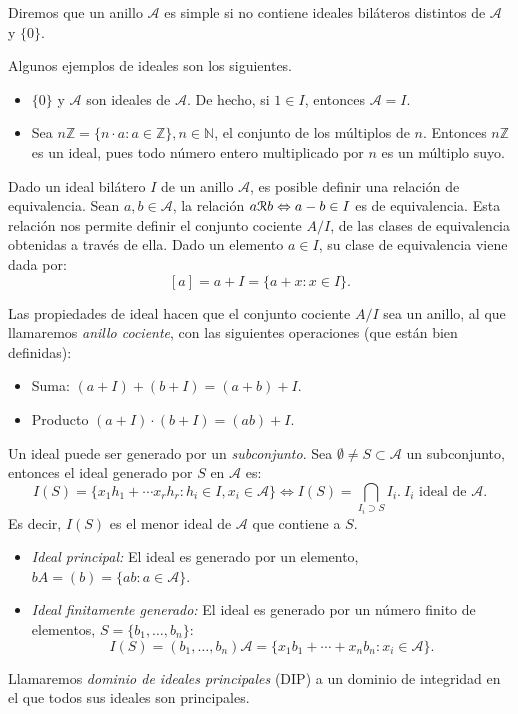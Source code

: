 \begin{definicion}
Diremos que un anillo $\mathcal{A}$ es simple si no contiene ideales biláteros distintos de $\mathcal{A}$ y $\{0\}$.
\end{definicion}

\begin{ejemplo} Algunos ejemplos de ideales son los siguientes.
    \begin{itemize}
        \item $\{0\}$ y $\mathcal{A}$ son ideales de $\mathcal{A}$. De hecho, si $1 \in I$, entonces $\mathcal{A} = I$.
        \item Sea $n\mathds{Z} = \{n\cdot a : a \in \mathds{Z}\}, n \in \mathds{N}$, el conjunto de los múltiplos de $n$. Entonces $n\mathds{Z}$ es un ideal, pues todo número entero multiplicado por $n$ es un múltiplo suyo.
    \end{itemize}
\end{ejemplo}

Dado un ideal bilátero $I$ de un anillo $\mathcal{A}$, es posible definir una relación de equivalencia. Sean $a,b \in \mathcal{A}$, la relación $a\mathcal R b \Leftrightarrow a - b \in I$ es de equivalencia. Esta relación nos permite definir el conjunto cociente $A/I$, de las clases de equivalencia obtenidas a través de ella. Dado un elemento $a \in I$, su clase de equivalencia viene dada por: $$ [a] = a + I = \{a + x : x \in I\}.$$

Las propiedades de ideal hacen que el conjunto cociente $A/I$ sea un anillo, al que llamaremos \emph{anillo cociente}, con las siguientes operaciones (que están bien definidas):
\begin{itemize}
    \item Suma: $(a + I) + (b + I) = (a + b) + I$.
    \item Producto $(a + I)\cdot(b + I) = (ab) + I$.
\end{itemize}

Un ideal puede ser generado por un \emph{subconjunto}. Sea $\emptyset \neq S \subset \mathcal{A}$ un subconjunto, entonces el ideal generado por $S$ en $\mathcal{A}$ es: 
$$I(S) = \{x_1h_1 + \cdots x_rh_r: h_i \in I, x_i \in \mathcal{A}\} \Leftrightarrow I(S) = \bigcap_{I_i \supset S} I_i. \ I_i \text{ ideal de }\mathcal{A}.$$
Es decir, $I(S)$ es el menor ideal de $\mathcal{A}$ que contiene a $S$.

    \begin{itemize}
    \item \emph{Ideal principal:} El ideal es generado por un elemento, $bA = (b) = \{ab : a \in \mathcal{A}\}$.
    \item \emph{Ideal finitamente generado:} El ideal es generado por un número finito de elementos, $S = \{b_1,\dots,b_n\}$: $$I(S) = (b_1,\dots,b_n)\mathcal{A} = \{x_1b_1 + \cdots + x_nb_n : x_i \in \mathcal{A}\}.$$
    \end{itemize}
\begin{definicion}
    Llamaremos \emph{dominio de ideales principales} (DIP) a un dominio de integridad en el que todos sus ideales son principales.
\end{definicion}


